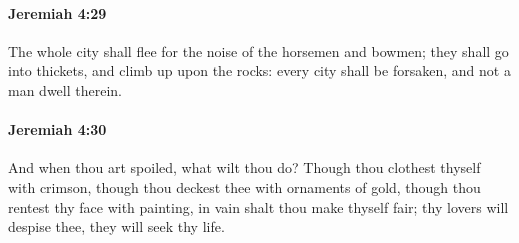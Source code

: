 		\paragraph{Jeremiah 4:29} %
			\label{JEREMIAH-4-29}

			The whole city shall flee for the noise of the horsemen and bowmen; they shall go into thickets, and climb up upon the rocks: every city shall be forsaken, and not a man dwell therein.


		\paragraph{Jeremiah 4:30} %
			\label{JEREMIAH-4-30}

			And when thou art spoiled, what wilt thou do? Though thou clothest thyself with crimson, though thou deckest thee with ornaments of gold, though thou rentest thy face with painting, in vain shalt thou make thyself fair; thy lovers will despise thee, they will seek thy life.

